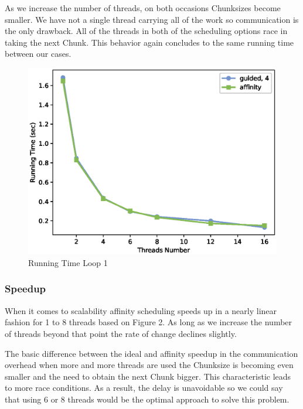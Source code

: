 \documentclass[12pt,a4paper]{article}
\begin{document}
As we increase the number of threads, on both occasions Chunksizes become smaller. We have not a single thread carrying all of the work so communication is the only drawback. All of the threads in both of the scheduling options race in taking the next Chunk. This behavior again concludes to the same running time between our cases.

\begin{figure}[ht]
    \centering
    \includegraphics[scale=0.6]{../graphs/loop1_running_time.eps}
    \caption{Running Time Loop 1}
    \label{Running Time Loop 1}
\end{figure}

\subsubsection{Speedup}

When it comes to scalability affinity scheduling speeds up in a nearly linear fashion for 1 to 8 threads based on Figure 2. As long as we increase the number of threads beyond that point the rate of change declines slightly.

The basic difference between the ideal and affinity speedup in the communication overhead when more and more threads are used the Chunksize is becoming even smaller and the need to obtain the next Chunk bigger. This characteristic leads to more race conditions. As a result, the delay is unavoidable so we could say that using 6 or 8 threads would be the optimal approach to solve this problem.
\end{document}
